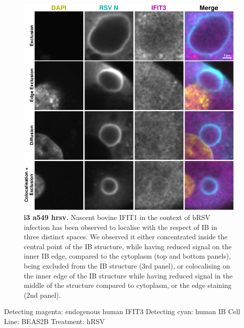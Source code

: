 \begin{figure}
    \centering
    \includegraphics[width=1\linewidth]{09. Chapter 4/Figs/02. Infection/02. IFIT3/03. a549 i3.pdf}
    \caption[i3 a549 hrsv]{\textbf{i3 a549 hrsv.} Nascent bovine IFIT1 in the context of bRSV infection has been observed to localise with the respect of IB in three distinct spaces. We observed it either concentrated inside the central point of the IB structure, while having reduced signal on the inner IB edge, compared to the cytoplasm (top and bottom panels), being excluded from the IB structure (3rd panel), or colocalising on the inner edge of the IB structure while having reduced signal in the middle of the structure compared to cytoplasm, or the edge staining (2nd panel).}
    \label{fig:i3 a549 hrsv}
\end{figure}

Detecting magenta: endogenous human IFIT3 \newline
Detecting cyan: human IB \newline
Cell Line: BEAS2B \newline
Treatment: hRSV \newline

